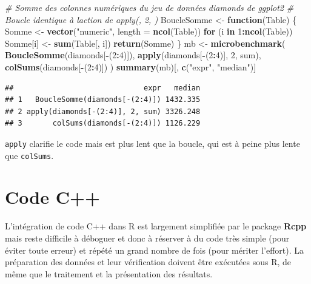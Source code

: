 \documentclass[
  12pt,
  french,
  a4paper,
  extrafontsizes,onecolumn,openright
  ]{memoir}
\newenvironment{Shaded}{\begin{snugshade}}{\end{snugshade}}
\newcommand{\AttributeTok}[1]{\textcolor[rgb]{0.13,0.29,0.53}{#1}}
\newcommand{\CommentTok}[1]{\textcolor[rgb]{0.56,0.35,0.01}{\textit{#1}}}
\newcommand{\ControlFlowTok}[1]{\textcolor[rgb]{0.13,0.29,0.53}{\textbf{#1}}}
\newcommand{\DecValTok}[1]{\textcolor[rgb]{0.00,0.00,0.81}{#1}}
\newcommand{\FunctionTok}[1]{\textcolor[rgb]{0.13,0.29,0.53}{\textbf{#1}}}
\newcommand{\NormalTok}[1]{#1}
\newcommand{\OtherTok}[1]{\textcolor[rgb]{0.56,0.35,0.01}{#1}}
\newcommand{\SpecialCharTok}[1]{\textcolor[rgb]{0.81,0.36,0.00}{\textbf{#1}}}
\newcommand{\StringTok}[1]{\textcolor[rgb]{0.31,0.60,0.02}{#1}}
\begin{document}
\begin{Shaded}
\begin{Highlighting}[]
\CommentTok{\# Somme des colonnes numériques du jeu de données diamonds de ggplot2}
\CommentTok{\# Boucle identique à l\textquotesingle{}action de apply(, 2, )}
\NormalTok{BoucleSomme }\OtherTok{\textless{}{-}} \ControlFlowTok{function}\NormalTok{(Table) \{}
\NormalTok{  Somme }\OtherTok{\textless{}{-}} \FunctionTok{vector}\NormalTok{(}\StringTok{"numeric"}\NormalTok{, }\AttributeTok{length =} \FunctionTok{ncol}\NormalTok{(Table))}
  \ControlFlowTok{for}\NormalTok{ (i }\ControlFlowTok{in} \DecValTok{1}\SpecialCharTok{:}\FunctionTok{ncol}\NormalTok{(Table)) Somme[i] }\OtherTok{\textless{}{-}} \FunctionTok{sum}\NormalTok{(Table[, i])}
  \FunctionTok{return}\NormalTok{(Somme)}
\NormalTok{\}}
\NormalTok{mb }\OtherTok{\textless{}{-}} \FunctionTok{microbenchmark}\NormalTok{(}
  \FunctionTok{BoucleSomme}\NormalTok{(diamonds[}\SpecialCharTok{{-}}\NormalTok{(}\DecValTok{2}\SpecialCharTok{:}\DecValTok{4}\NormalTok{)]), }
  \FunctionTok{apply}\NormalTok{(diamonds[}\SpecialCharTok{{-}}\NormalTok{(}\DecValTok{2}\SpecialCharTok{:}\DecValTok{4}\NormalTok{)], }\DecValTok{2}\NormalTok{, sum), }
  \FunctionTok{colSums}\NormalTok{(diamonds[}\SpecialCharTok{{-}}\NormalTok{(}\DecValTok{2}\SpecialCharTok{:}\DecValTok{4}\NormalTok{)])}
\NormalTok{)}
\FunctionTok{summary}\NormalTok{(mb)[, }\FunctionTok{c}\NormalTok{(}\StringTok{"expr"}\NormalTok{, }\StringTok{"median"}\NormalTok{)]}
\end{Highlighting}
\end{Shaded}

\begin{verbatim}
##                              expr   median
## 1   BoucleSomme(diamonds[-(2:4)]) 1432.335
## 2 apply(diamonds[-(2:4)], 2, sum) 3326.248
## 3       colSums(diamonds[-(2:4)]) 1126.229
\end{verbatim}

\normalsize

\texttt{apply} clarifie le code mais est plus lent que la boucle, qui est à peine plus lente que \texttt{colSums}.

\section{Code C++}\label{sec:cpp}

L'intégration de code C++ dans R est largement simplifiée par le package \textbf{Rcpp} mais reste difficile à déboguer et donc à réserver à du code très simple (pour éviter toute erreur) et répété un grand nombre de fois (pour mériter l'effort).
La préparation des données et leur vérification doivent être exécutées sous R, de même que le traitement et la présentation des résultats.
\end{document}
